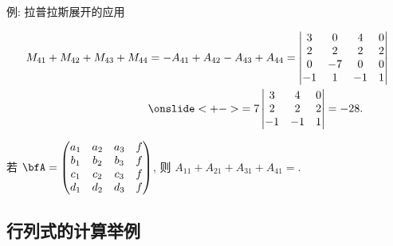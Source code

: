 \begin{frame}{例: 拉普拉斯展开的应用}
	\onslide<+->
		\begin{solution}[续解]
			\vspace{-\baselineskip}
			\begin{align*}
				M_{41}+M_{42}+M_{43}+M_{44}
				&=-A_{41}+A_{42}-A_{43}+A_{44}
				=\begin{vmatrix}
					3&0&4&0\\
					2&2&2&2\\
					0&-7&0&0\\
					-1&1&-1&1
				\end{vmatrix}\\
				&\onslide<+->{=7\begin{vmatrix}
					3&4&0\\
					2&2&2\\
					-1&-1&1
				\end{vmatrix}=-28.}
		\end{align*}
	\end{solution}
	\onslide<+->
	\begin{exercise}
		若 $\bfA=\begin{pmatrix}
			a_1&a_2&a_3&f\\
			b_1&b_2&b_3&f\\
			c_1&c_2&c_3&f\\
			d_1&d_2&d_3&f
		\end{pmatrix}$,
		则 $A_{11}+A_{21}+A_{31}+A_{41}=$.
		\vspace{-.2\baselineskip}
	\end{exercise}
\end{frame}


\subsection{行列式的计算举例}


